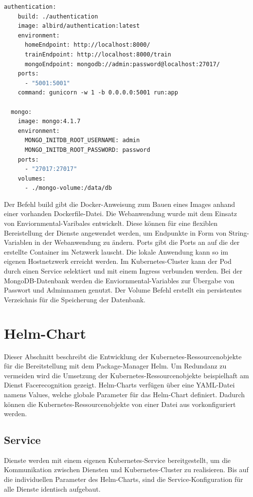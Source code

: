 \begin{lstlisting}[caption={Ausschnit aus dem docker-compose.yaml},captionpos=b ,label={lst:docker-compose.yaml},language=Dockerfile]
  authentication:
    build: ./authentication
    image: albird/authentication:latest
    environment:
      homeEndpoint: http://localhost:8000/
      trainEndpoint: http://localhost:8000/train 
      mongoEndpoint: mongodb://admin:password@localhost:27017/
    ports:
      - "5001:5001"
    command: gunicorn -w 1 -b 0.0.0.0:5001 run:app

  mongo:
    image: mongo:4.1.7
    environment:
      MONGO_INITDB_ROOT_USERNAME: admin
      MONGO_INITDB_ROOT_PASSWORD: password
    ports:
      - "27017:27017"
    volumes:
      - ./mongo-volume:/data/db
  \end{lstlisting}

Der Befehl build gibt die Docker-Anweisung zum Bauen eines Images anhand einer vorhanden Dockerfile-Datei.
Die Webanwendung wurde mit dem Einsatz von Enviornmental-Varibales entwickelt.
Diese können für eine flexiblen Bereistellung der Dienste angewendet werden, um Endpunkte in Form von String-Variablen in der Webanwendung zu ändern.
Ports gibt die Ports an auf die der erstellte Container im Netzwerk lauscht.
Die lokale Anwendung kann so im eigenen Hostnetzwerk erreicht werden.
Im Kubernetes-Cluster kann der Pod durch einen Service selektiert und mit einem Ingress verbunden werden.
Bei der MongoDB-Datenbank werden die Enviornmental-Variables zur Übergabe von Passwort und Adminnamen genutzt.
Der Volume Befehl erstellt ein persistentes Verzeichnis für die Speicherung der Datenbank.


\section{Helm-Chart}
Dieser Abschnitt beschreibt die Entwicklung der Kubernetes-Ressourcenobjekte für die Bereitstellung mit dem Package-Manager Helm.
Um Redundanz zu vermeiden wird die Umsetzung der Kubernetes-Ressourcenobjekte beispielhaft am Dienst Facerecognition gezeigt.
Helm-Charts verfügen über eine YAML-Datei namens Values, welche globale Parameter für das Helm-Chart definiert.
Dadurch können die Kubernetes-Ressourcenobjekte von einer Datei aus vorkonfiguriert werden.



\subsection{Service}
Dienste werden mit einem eigenen Kubernetes-Service bereitgestellt, um die Kommunikation zwischen Diensten und Kubernetes-Cluster zu realisieren.
Bis auf die individuellen Parameter des Helm-Charts, sind die Service-Konfiguration für alle Dienste identisch aufgebaut.

